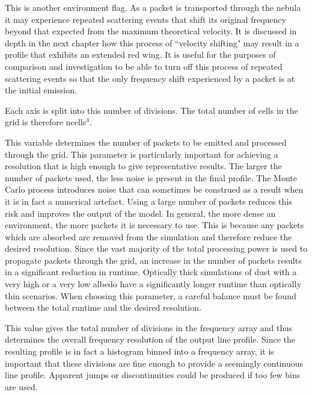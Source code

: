 
 This is another environment flag.  As a packet is transported through the nebula it may experience repeated scattering events that shift its original frequency beyond that expected from the maximum theoretical velocity.  It is discussed in depth in the next chapter how this process of ``velocity shifting" may result in a profile that exhibits an extended red wing.  It is useful for the purposes of comparison and investigation to be able to turn off this process of repeated scattering events so that the only frequency shift experienced by a packet is at the initial emission.




 Each axis is split into this number of divisions.  The total number of cells in the grid is therefore ncells$^3$.



 This variable determines the number of packets to be emitted and processed through the grid.  This parameter is particularly important for achieving a resolution that is high enough to give representative results.  The larger the number of packets used, the less noise is present in the final profile.  The Monte Carlo process introduces noise that can sometimes be construed as a result when it is in fact a numerical artefact.  Using a large number of packets reduces this risk and improves the output of the model.  In general, the more dense an environment, the more packets it is necessary to use.  This is because any packets which are absorbed are removed from the simulation and therefore reduce the desired resolution.  Since the vast majority of the total processing power is used to propagate packets through the grid, an increase in the number of packets results in a significant reduction in runtime. Optically thick simulations of dust with a very high or a very low albedo have a significantly longer runtime than optically thin scenarios.  When choosing this parameter, a careful balance must be found between the total runtime and the desired resolution. 



 This value gives the total number of divisions in the frequency array and thus determines the overall frequency resolution of the output line profile.  Since the resulting profile is in fact a histogram binned into a frequency array, it is important that these divisions are fine enough to provide a seemingly continuous line profile.  Apparent jumps or discontinuities could be produced if too few bins are used.

